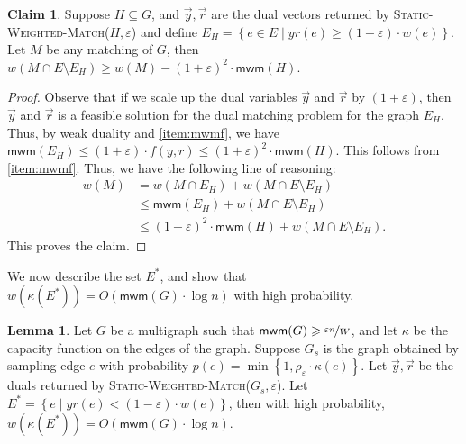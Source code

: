 \documentclass[a4paper,11pt]{article}
\newcommand{\set}[1]{\ensuremath{\left\{ #1 \right\}}}
\newcommand{\eps}{\varepsilon}
\theoremstyle{definition}
\theoremstyle{definition}
\theoremstyle{definition}
\theoremstyle{definition}
\theoremstyle{definition}
\newtheorem{lemma2}[definition2]{Lemma}
\theoremstyle{definition}
\theoremstyle{definition}
\theoremstyle{definition}
\newtheorem{claim2}[definition2]{Claim}
\theoremstyle{definition}
\theoremstyle{definition}
\theoremstyle{definition}
\theoremstyle{definition}
\theoremstyle{definition}
\theoremstyle{definition}
\theoremstyle{definition}
\begin{document}
\begin{claim2}\label{claim:LotofMedges}
Suppose $H\subseteq G$, and $\vec{y}, \vec{r}$ are the dual vectors returned by \textsc{Static-Weighted-Match}($H,\eps$) and define $E_{H}=\set{e\in E\mid yr(e)\geqslant (1-\eps)\cdot w(e)}$. Let $M$ be any matching of $G$, then $w(M\cap E\setminus E_{H})\geqslant w(M)-(1+\eps)^2\cdot\textsf{mwm}(H)$. 
\end{claim2}
\begin{proof}
Observe that if we scale up the dual variables $\vec{y}$ and $\vec{r}$ by $(1+\eps)$, then $\vec{y}$ and $\vec{r}$ is a feasible solution for the dual matching problem for the graph $E_H$. Thus, by weak duality and \ref{item:mwmf}, we have $\textsf{mwm}(E_H)\leqslant (1+\eps)\cdot f(y,r)\leqslant (1+\eps)^2\cdot \textsf{mwm}(H)$. This follows from \ref{item:mwmf}. Thus, we have the following line of reasoning:
\begin{align*}
w(M)&=w(M\cap E_H)+w(M\cap E\setminus E_H)\\
	&\leqslant \textsf{mwm}(E_H)+w(M\cap E\setminus E_H)\\
	&\leqslant (1+\eps)^2\cdot \textsf{mwm}(H)+w(M\cap E\setminus E_H).
\end{align*}
This proves the claim. 
\end{proof}

We now describe the set $E^*$, and show that $w(\kappa(E^*))=O(\textsf{mwm}(G)\cdot \log n)$ with high probability. 

\begin{lemma2}\label{lem:setE*}
Let $G$ be a multigraph such that $\textsf{mwm}(G)\geqslant \nicefrac{\eps n}{W}$, and let $\kappa$ be the capacity function on the edges of the graph. Suppose $G_s$ is the graph obtained by sampling edge $e$ with probability $p(e)=\min\set{1, \rho_{\eps}\cdot \kappa(e)}$. Let $\vec{y},\vec{r}$ be the duals returned by \textsc{Static-Weighted-Match}($G_s,\eps$). Let $E^*=\set{e\mid yr(e)<(1-\eps)\cdot w(e)}$, then with high probability, $w(\kappa(E^*))=O(\textsf{mwm}(G)\cdot \log n)$. 
\end{lemma2}
\end{document}

